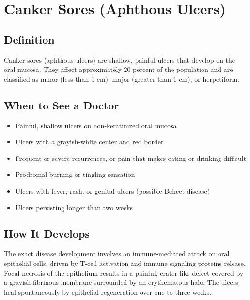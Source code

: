 \chapter{Canker Sores (Aphthous Ulcers)}

\section*{Definition}
Canker sores (aphthous ulcers) are shallow, painful ulcers that develop on the oral mucosa. They affect approximately 20 percent of the population and are classified as minor (less than 1 cm), major (greater than 1 cm), or herpetiform.

\section*{When to See a Doctor}
\begin{itemize}
\item Painful, shallow ulcers on non-keratinized oral mucosa
\item Ulcers with a grayish-white center and red border
 \item Frequent or severe recurrences, or pain that makes eating or drinking difficult
\item Prodromal burning or tingling sensation
\item Ulcers with fever, rash, or genital ulcers (possible Behcet disease)
\item Ulcers persisting longer than two weeks
\end{itemize}

\section*{How It Develops}
The exact disease development involves an immune-mediated attack on oral epithelial cells, driven by T-cell activation and immune signaling proteins release. Focal necrosis of the epithelium results in a painful, crater-like defect covered by a grayish fibrinous membrane surrounded by an erythematous halo. The ulcers heal spontaneously by epithelial regeneration over one to three weeks.


